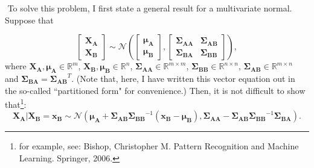 \begin{problem}{3} $ $
To solve this problem, I first state a general result for a multivariate normal.  Suppose that 

\begin{equation*}
\begin{bmatrix} \bm{X_A} \\ \bm{X_B} \end{bmatrix} \sim \mathcal N \left(\begin{bmatrix} \bm{\mu_A} \\ \bm{\mu_B }\end{bmatrix},   \left[\begin{matrix}
    \bm{\Sigma_{AA}} & \bm{\Sigma_{AB}}\\
    \bm{\Sigma_{BA}} & \bm{\Sigma_{BB}}
\end{matrix}\right] \right),
\end{equation*}
where $\bm{X_A}, \bm{\mu_A} \in \mathbb R^{m}$, $\bm{X_B}, \bm{\mu_B} \in \mathbb R^{n}$, $\bm{\Sigma_{AA}} \in \mathbb R^{m\times m}$, $\bm{\Sigma_{BB}} \in \mathbb R^{n\times n}$, $\bm{\Sigma_{AB}} \in \mathbb R^{m\times n}$ and $\bm{\Sigma_{BA}} =\bm{\Sigma_{AB}}^T $.  (Note that, here, I have written this vector equation out in the so-called ``partitioned form" for convenience.)  Then, it is not difficult to show that\footnote{for example, see: Bishop, Christopher M. Pattern Recognition and Machine Learning. Springer,
2006.}:
\begin{equation*}
\bm{X_A}|\bm{X_B} = \bm{x_B} \sim \mathcal N (\bm{\mu_A}+\bm{\Sigma_{AB}} \bm{\Sigma_{BB}}^{-1}(\bm{x_B}-\bm{\mu_{B}}), \bm{\Sigma_{AA}}-\bm{\Sigma_{AB}}\bm{\Sigma_{BB}}^{-1}\bm{\Sigma_{BA}}).
\end{equation*}


\end{problem}
